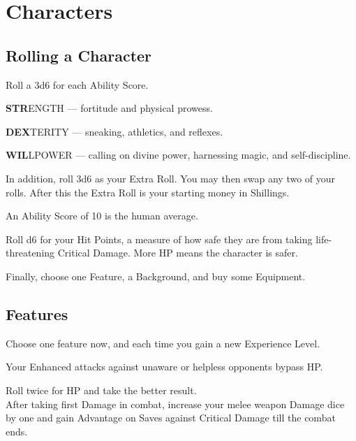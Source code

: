 \documentclass[itdr]{subfiles}
\begin{document}
\chapter{Characters}
\resetHeaders

\section{Rolling a Character}

Roll a 3d6 for each Ability Score.

\vspace{0.6em}

\textbf{STR}ENGTH --- fortitude and physical prowess.

\textbf{DEX}TERITY --- sneaking, athletics, and reflexes.

\textbf{WIL}LPOWER --- calling on divine power, harnessing magic, and self-discipline.

\vspace{0.6em}

In addition, roll 3d6 as your Extra Roll. You may then swap any two of your rolls. After this the Extra Roll is your starting money in Shillings.

An Ability Score of 10 is the human average.

Roll d6 for your Hit Points, a measure of how safe they are from taking life-threatening Critical Damage. More HP means the character is safer.

Finally, choose one Feature, a Background, and buy some Equipment.


\section{Features}

Choose one feature now, and each time you gain a new Experience Level.

Your Enhanced attacks against unaware or helpless opponents bypass HP.

 Roll twice for HP and take the better result.\\
After taking first Damage in combat, increase your melee weapon Damage dice by one and gain Advantage on Saves against Critical Damage till the combat ends.
\end{document}
